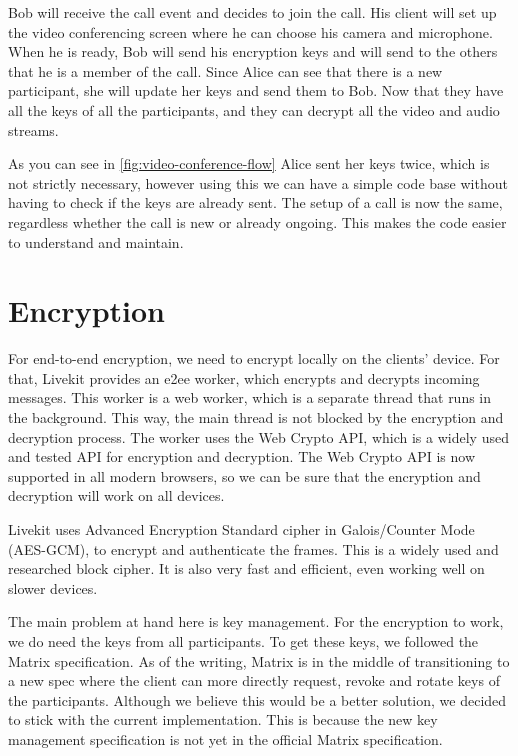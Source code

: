 \documentclass{report}
\begin{document}
Bob will receive the call event and decides to join the call. His client will set up the video conferencing
screen where he can choose his camera and microphone. When he is ready, Bob will send his encryption keys and will
send to the others that he is a member of the call. Since Alice can see that there is a new participant, she will
update her keys and send them to Bob. Now that they have all the keys of all the participants, and they can decrypt
all the video and audio streams.

As you can see in \autoref{fig:video-conference-flow} Alice sent her keys twice, which is not strictly necessary,
however using this we can have a simple code base without having to check if the keys are already sent. The setup of
a call is now the same, regardless whether the call is new or already ongoing. This makes the code easier to
understand and maintain.

\section{Encryption}
For end-to-end encryption, we need to encrypt locally on the clients' device. For that, Livekit provides an e2ee worker,
which encrypts and decrypts incoming messages. This worker is a web worker, which is a separate
thread that runs in the background. This way, the main thread is not blocked by the encryption and decryption
process. The worker uses the Web Crypto API, which is a widely used and tested API for encryption and decryption.
The Web Crypto API is now supported in all modern browsers, so we can be sure that the encryption and decryption will
work on all devices.

Livekit uses Advanced Encryption Standard cipher in Galois/Counter Mode (AES-GCM)\cite{national_institute_of_standards_and_technology_us_advanced_2023}\cite{
mcgrew_galoiscounter_nodate}, to encrypt and authenticate the frames. This is a widely used and researched block
cipher. It is also very fast and efficient, even working well on slower devices.

The main problem at hand here is key management. For the encryption to work, we do need the keys from all
participants. To get these keys, we followed the Matrix specification. As of the writing, Matrix is in the middle
of transitioning to a new spec where the client can more directly request, revoke and rotate keys of the
participants. Although we believe this would be a better solution, we decided to stick with the current
implementation. This is because the new key management specification is not yet in the official Matrix specification.
\end{document}
